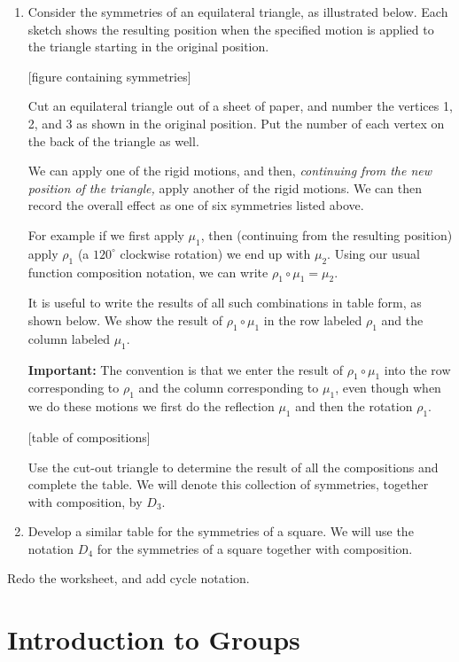 \begin{enumerate}
    \item Consider the symmetries of an equilateral triangle, as illustrated below. Each sketch shows the resulting position when the specified motion is applied to the triangle starting in the original position.

    [figure containing symmetries]

    Cut an equilateral triangle out of a sheet of paper, and number the vertices 1, 2, and 3 as shown in the original position. Put the number of each vertex on the back of the triangle as well.

    We can apply one of the rigid motions, and then, \textit{continuing from the new position of the triangle,} apply another of the rigid motions. We can then record the overall effect as one of six symmetries listed above.

    For example if we first apply $\mu_1$, then (continuing from the resulting position) apply $\rho_1$ (a $120^\circ$ clockwise rotation) we end up with $\mu_2$. Using our usual function composition notation, we can write $\rho_1 \circ \mu_1 = \mu_2$.

    It is useful to write the results of all such combinations in table form, as shown below. We show the result of $\rho_1 \circ \mu_1$ in the row labeled $\rho_1$ and the column labeled $\mu_1$.

    \textbf{Important:} The convention is that we enter the result of $\rho_1 \circ \mu_1$ into the row corresponding to $\rho_1$ and the column corresponding to $\mu_1$, even though when we do these motions we first do the reflection $\mu_1$ and then the rotation $\rho_1$.

    [table of compositions]

    Use the cut-out triangle to determine the result of all the compositions and complete the table. We will denote this collection of symmetries, together with composition, by $D_3$.

    \item Develop a similar table for the symmetries of a square. We will use the notation $D_4$ for the symmetries of a square together with composition.

\end{enumerate}
Redo the worksheet, and add cycle notation.

\chapter{Introduction to Groups}

